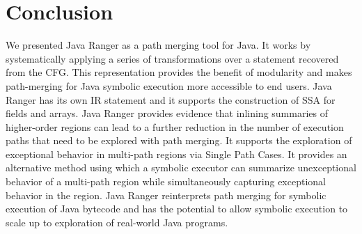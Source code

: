 \section{Conclusion}
\label{sec:future}

We presented Java Ranger as a path merging tool for Java.
%
It works by systematically applying a series of transformations over a statement recovered from the CFG. This
representation provides the benefit of modularity and makes path-merging for Java symbolic execution more accessible to
end users.
%
Java Ranger has its own IR statement and it supports the construction of SSA for fields and arrays.
%
Java Ranger provides evidence that inlining summaries of higher-order regions can lead to a further reduction in the
number of execution paths that need to be explored with path merging.
%
It supports the exploration of exceptional behavior in multi-path regions via Single Path Cases.
%
It provides an alternative method using which a symbolic executor can summarize unexceptional behavior of a multi-path
region while simultaneously capturing exceptional behavior in the region.
%
Java Ranger reinterprets path merging for symbolic execution of Java bytecode and has the potential to allow symbolic
execution to scale up to exploration of real-world Java programs.


